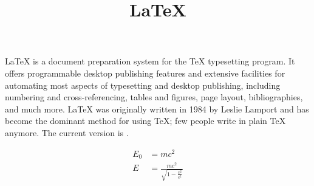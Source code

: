 \documentclass{article} %
\title{\LaTeX} %
\begin{document}
  \maketitle
  \LaTeX{} is a document preparation system for
  the \TeX{} typesetting program. It offers
  programmable desktop publishing features and
  extensive facilities for automating most
  aspects of typesetting and desktop publishing,
  including numbering and cross-referencing,
  tables and figures, page layout,
  bibliographies, and much more. \LaTeX{} was
  originally written in 1984 by Leslie Lamport
  and has become the dominant method for using
  \TeX; few people write in plain \TeX{} anymore.
  The current version is \LaTeXe.

  \begin{align}
    E_0 &= mc^2 \\
    E &= \frac{mc^2}{\sqrt{1-\frac{v^2}{c^2}}}
  \end{align} 
\end{document}
